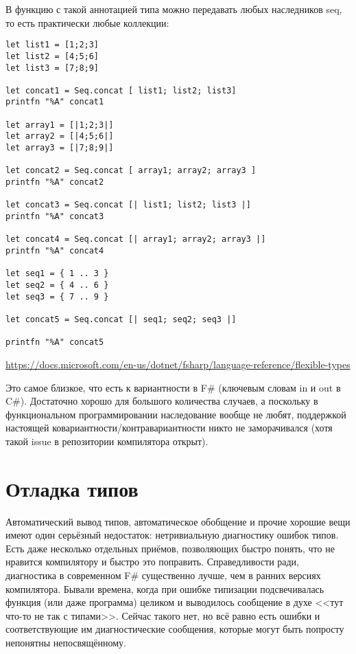 \documentclass[a5paper]{article}
\newcommand{\attribution}[1] {
    \begin{flushright}\begin{scriptsize}\textcolor{gray}{#1}\end{scriptsize}\end{flushright}
}
\begin{document}
В функцию с такой аннотацией типа можно передавать любых наследников seq, то есть практически любые коллекции:

\begin{verbatim}
let list1 = [1;2;3]
let list2 = [4;5;6]
let list3 = [7;8;9]

let concat1 = Seq.concat [ list1; list2; list3]
printfn "%A" concat1

let array1 = [|1;2;3|]
let array2 = [|4;5;6|]
let array3 = [|7;8;9|]

let concat2 = Seq.concat [ array1; array2; array3 ]
printfn "%A" concat2

let concat3 = Seq.concat [| list1; list2; list3 |]
printfn "%A" concat3

let concat4 = Seq.concat [| array1; array2; array3 |]
printfn "%A" concat4

let seq1 = { 1 .. 3 }
let seq2 = { 4 .. 6 }
let seq3 = { 7 .. 9 }

let concat5 = Seq.concat [| seq1; seq2; seq3 |]

printfn "%A" concat5
\end{verbatim}
\attribution{\url{https://docs.microsoft.com/en-us/dotnet/fsharp/language-reference/flexible-types}}

Это самое близкое, что есть к вариантности в F\# (ключевым словам in и out в C\#). Достаточно хорошо для большого количества случаев, а поскольку в функциональном программировании наследование вообще не любят, поддержкой настоящей ковариантности/контравариантности никто не заморачивался (хотя такой issue в репозитории компилятора открыт).


\section{Отладка типов}

Автоматический вывод типов, автоматическое обобщение и прочие хорошие вещи имеют один серьёзный недостаток: нетривиальную диагностику ошибок типов. Есть даже несколько отдельных приёмов, позволяющих быстро понять, что не нравится компилятору и быстро это поправить. Справедливости ради, диагностика в современном F\# существенно лучше, чем в ранних версиях компилятора. Бывали времена, когда при ошибке типизации подсвечивалась функция (или даже программа) целиком и выводилось сообщение в духе <<тут что-то не так с типами>>. Сейчас такого нет, но всё равно есть ошибки и соответствующие им диагностические сообщения, которые могут быть попросту непонятны непосвящённому.
\end{document}
